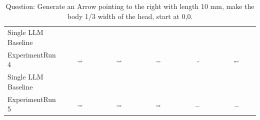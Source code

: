 \begin{table}
\begin{tabular}{@{}lccccc@{}}
    Single LLM Baseline \\
    ExperimentRun 4 & \includegraphics[width=0.15\textwidth]{./run_4/png/gpt-4o_results/Arrow.png} & \includegraphics[width=0.15\textwidth]{./run_4/png/o1-preview_results/Arrow.png} & \includegraphics[width=0.15\textwidth]{./run_4/png/claude-3-5-sonnet-20240620_results/Arrow.png} & \includegraphics[width=0.15\textwidth]{./run_4/png/watsonx_meta-llama_llama-3-1-70b-instruct_results/Arrow.png} & \includegraphics[width=0.15\textwidth]{./run_4/png/watsonx_meta-llama_llama-3-405b-instruct_results/Arrow.png} \\
    Single LLM Baseline \\
    ExperimentRun 5 & \includegraphics[width=0.15\textwidth]{./run_5/png/gpt-4o_results/Arrow.png} & \includegraphics[width=0.15\textwidth]{./run_5/png/o1-preview_results/Arrow.png} & \includegraphics[width=0.15\textwidth]{./run_5/png/claude-3-5-sonnet-20240620_results/Arrow.png} & \includegraphics[width=0.15\textwidth]{./run_5/png/watsonx_meta-llama_llama-3-1-70b-instruct_results/Arrow.png} & \includegraphics[width=0.15\textwidth]{./run_5/png/watsonx_meta-llama_llama-3-405b-instruct_results/Arrow.png} \\
    \bottomrule
  \end{tabular}
  \caption*{Question: Generate an Arrow pointing to the right with length 10 mm, make the body 1/3 width of the head, start at 0,0.}
\end{table}


